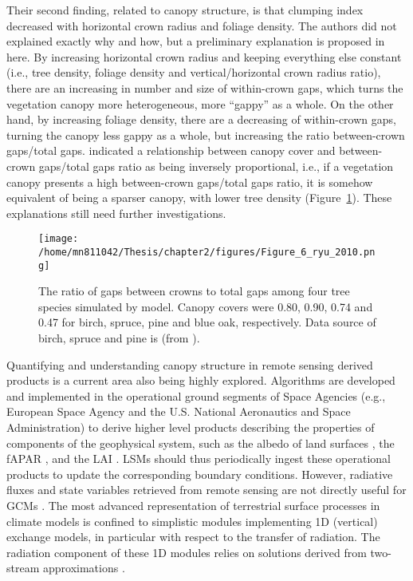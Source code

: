 Their second finding, related to canopy structure, is that clumping index decreased with horizontal crown radius and foliage density. The authors did not explained exactly why and how, but a preliminary explanation is proposed in here. By increasing horizontal crown radius and keeping everything else constant (i.e., tree density, foliage density and vertical/horizontal crown radius ratio), there are an increasing in number and size of within-crown gaps, which turns the vegetation canopy more heterogeneous, more ``gappy'' as a whole. On the other hand, by increasing foliage density, there are a decreasing of within-crown gaps, turning the canopy less gappy as a whole, but increasing the ratio between-crown gaps/total gaps. \citet{Ryu2010} indicated a relationship between canopy cover and between-crown gaps/total gaps ratio as being inversely proportional, i.e., if a vegetation canopy presents a high between-crown gaps/total gaps ratio, it is somehow equivalent of being a sparser canopy, with lower tree density (Figure~\ref{f:ryu2010}). These explanations still need further investigations.

\begin{figure}[ht!]
\centering
\texttt{[image: /home/mn811042/Thesis/chapter2/figures/Figure\_6\_ryu\_2010.png]}
\caption{The ratio of gaps between crowns to total gaps among four tree species simulated by \citet{Nilson1999} model. Canopy covers were 0.80, 0.90, 0.74 and 0.47 for birch, spruce, pine and blue oak, respectively. Data source of birch, spruce and pine is \citet{Nilson1999} (from \citet{Ryu2010}).}
\label{f:ryu2010}
\end{figure}

Quantifying and understanding canopy structure in remote sensing derived products is a current area also being highly explored. Algorithms are developed and implemented in the operational ground segments of Space Agencies (e.g., European Space Agency and the U.S. National Aeronautics and Space Administration) to derive higher level products describing the properties of components of the geophysical system, such as the albedo of land surfaces \citep{Schaaf2002}, the fAPAR \citep{Gobron1999}, and the LAI \citep{Myneni2002}. LSMs should thus periodically ingest these operational products to update the corresponding boundary conditions. However, radiative fluxes and state variables retrieved from remote sensing are not directly useful for GCMs \citep{pinty2006}. 
The most advanced representation of terrestrial surface processes in climate models is confined to simplistic modules implementing 1D (vertical) exchange models, in particular with respect to the transfer of radiation. The radiation component of these 1D modules relies on solutions derived from two-stream approximations \citep{pinty2006}. 

